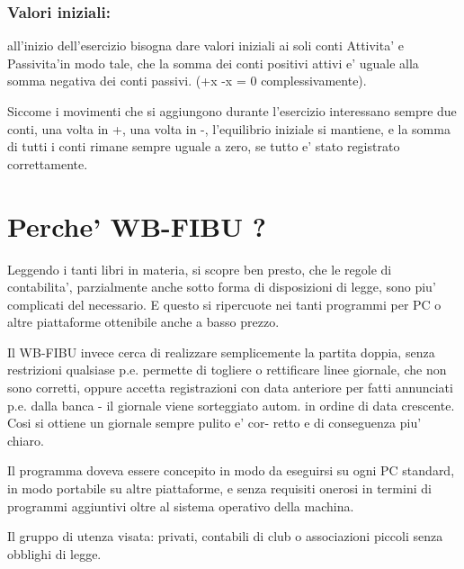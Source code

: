 \documentclass[12pt]{report}
\begin{document}
\subsubsection{Valori iniziali:} all'inizio dell'esercizio bisogna dare valori
iniziali ai soli conti Attivita' e Passivita'in modo tale, che la somma dei
conti positivi attivi e' uguale alla somma negativa dei conti passivi.  (+x -x
= 0 complessivamente).

Siccome i movimenti che si aggiungono durante l'esercizio interessano sempre
due conti, una volta in +, una volta in -, l'equilibrio iniziale si mantiene,
e la somma di tutti i conti rimane sempre uguale a zero, se tutto e' stato 
registrato correttamente.

\section{Perche' WB-FIBU ?}

Leggendo i tanti libri in materia, si scopre ben presto, che le regole di 
contabilita', parzialmente anche sotto forma di disposizioni di legge, sono
piu' complicati del necessario. E questo si ripercuote nei tanti programmi
per PC o altre piattaforme ottenibile anche a basso prezzo.

Il WB-FIBU invece cerca di realizzare semplicemente la partita doppia, senza 
restrizioni qualsiase p.e. permette di togliere o rettificare linee giornale, 
che non sono corretti, oppure accetta registrazioni con data anteriore per
fatti annunciati p.e. dalla banca - il giornale viene sorteggiato autom. in 
ordine di data crescente. Cosi si ottiene un giornale sempre pulito e' cor- 
retto e di conseguenza piu' chiaro.

Il programma doveva essere concepito in modo da eseguirsi su ogni PC 
standard, in modo portabile su altre piattaforme, e senza requisiti onerosi 
in termini di programmi aggiuntivi oltre al sistema operativo della machina.

Il gruppo di utenza visata: privati, contabili di club o associazioni piccoli 
senza obblighi di legge.
\end{document}
